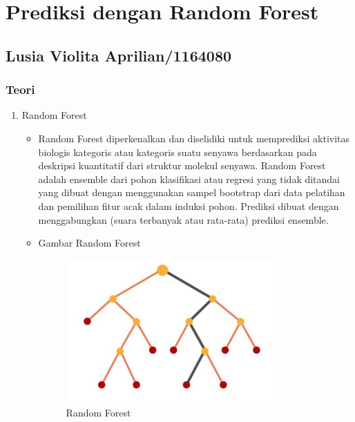 \chapter{Prediksi dengan Random Forest}

\section{Lusia Violita Aprilian/1164080}
\subsection{Teori}
\begin{enumerate}
\item Random Forest
	\begin{itemize}
	\item Random Forest diperkenalkan dan diselidiki untuk memprediksi aktivitas biologis kategoris atau kategoris suatu senyawa berdasarkan pada deskripsi kuantitatif dari struktur molekul senyawa. Random Forest adalah ensemble dari pohon klasifikasi atau regresi yang tidak ditandai yang dibuat dengan menggunakan sampel bootstrap dari data pelatihan dan pemilihan fitur acak dalam induksi pohon. Prediksi dibuat dengan menggabungkan (suara terbanyak atau rata-rata) prediksi ensemble.
	\item Gambar Random Forest
		\begin{figure}[ht]
		\centering
		\includegraphics[scale=0.5]{figures/j1.jpg}
		\caption{Random Forest}
		\label{contoh}
		\end{figure}
	\end{itemize}


\end{enumerate}
